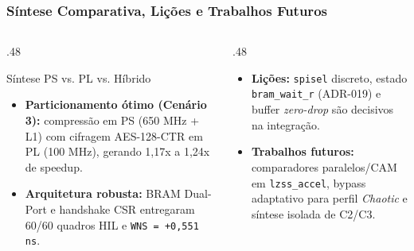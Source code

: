 \begin{frame}
  \frametitle{S\'intese Comparativa, Li\c{c}\~oes e Trabalhos Futuros}
  \begin{columns}[T]
    \begin{column}{.48\textwidth}
      \begin{block}{S\'intese PS vs. PL vs. H\'ibrido}
        \begin{itemize}
          \item \textbf{Particionamento \'otimo (Cen\'ario 3):} compress\~ao em PS (650 MHz + L1) com cifragem AES-128-CTR em PL (100 MHz), gerando 1,17x a 1,24x de speedup.
          \item \textbf{Arquitetura robusta:} BRAM Dual-Port e handshake CSR entregaram 60/60 quadros HIL e \texttt{WNS = +0,551 ns}.
        \end{itemize}
      \end{block}
    \end{column}
    \begin{column}{.48\textwidth}
      \begin{pontoschave}
        \begin{itemize}
          \item \textbf{Li\c{c}\~oes:} \texttt{spisel} discreto, estado \texttt{bram\_wait\_r} (ADR-019) e buffer \textit{zero-drop} s\~ao decisivos na integra\c{c}\~ao.
          \item \textbf{Trabalhos futuros:} comparadores paralelos/CAM em \texttt{lzss\_accel}, bypass adaptativo para perfil \textit{Chaotic} e s\'intese isolada de C2/C3.
        \end{itemize}
      \end{pontoschave}
    \end{column}
  \end{columns}
\end{frame}
